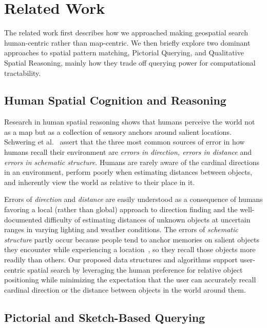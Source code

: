 \section{Related Work}
\label{section:related}

The related work first describes how we approached making geospatial search human-centric rather than map-centric. 
We then briefly explore two dominant approaches to spatial pattern matching, Pictorial Querying, and Qualitative Spatial Reasoning, mainly how they trade off querying power for computational tractability. 

\subsection{Human Spatial Cognition and Reasoning}
\par{Research in human spatial reasoning shows that humans perceive the world not as a map but as a collection of sensory anchors around salient locations. 
Schwering et al.~\cite{Schwering2014} assert that the three most common sources of error in how humans recall their environment are \textit{errors in direction, errors in distance} and \textit{errors in schematic structure}.
Humans are rarely aware of the cardinal directions in an environment, perform poorly when estimating distances between objects, and inherently view the world as relative to their place in it.}
%
\par{Errors of \textit{direction} and \textit{distance} are easily understood as a consequence of humans favoring a local (rather than global) approach to direction finding and the well-documented difficulty of estimating distances of unknown objects at uncertain ranges in varying lighting and weather conditions. 
The errors of \textit{schematic structure} partly occur because people tend to anchor memories on salient objects they encounter while experiencing a location~\cite{Helbing2020}, so they recall those objects more readily than others.
Our proposed data structures and algorithms support user-centric spatial search by leveraging the human preference for relative object positioning while minimizing the expectation that the user can accurately recall cardinal direction or the distance between objects in the world around them.}

\subsection{Pictorial and Sketch-Based Querying}

